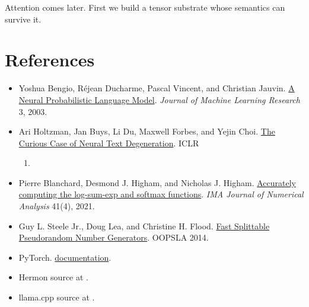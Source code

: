 Attention comes later. First we build a tensor substrate whose semantics
can survive it.

\section{References}\label{references-1}

\begin{itemize}
\tightlist
\item
  Yoshua Bengio, Réjean Ducharme, Pascal Vincent, and Christian Jauvin.
  \href{https://jmlr.org/papers/v3/bengio03a.html}{A Neural
  Probabilistic Language Model}. \emph{Journal of Machine Learning
  Research} 3, 2003.
\item
  Ari Holtzman, Jan Buys, Li Du, Maxwell Forbes, and Yejin Choi.
  \href{https://arxiv.org/abs/1904.09751}{The Curious Case of Neural
  Text Degeneration}. ICLR

  \begin{enumerate}
  \def\labelenumi{\arabic{enumi}.}
  \setcounter{enumi}{2019}
  \tightlist
  \item
\end{enumerate}
\item
  Pierre Blanchard, Desmond J. Higham, and Nicholas J. Higham.
  \href{https://doi.org/10.1093/imanum/draa038}{Accurately computing the
  log-sum-exp and softmax functions}. \emph{IMA Journal of Numerical
  Analysis} 41(4), 2021.
\item
  Guy L. Steele Jr., Doug Lea, and Christine H. Flood.
  \href{https://doi.org/10.1145/2660193.2660195}{Fast Splittable
  Pseudorandom Number Generators}. OOPSLA 2014.
\item
  PyTorch.
  \href{https://docs.pytorch.org/docs/stable/generated/torch.nn.Softmax.html}{\texttt{}
  documentation}.
\item
  Hermon source at
  \texttt{}.
\item
  llama.cpp source at
  \texttt{}.
\end{itemize}



